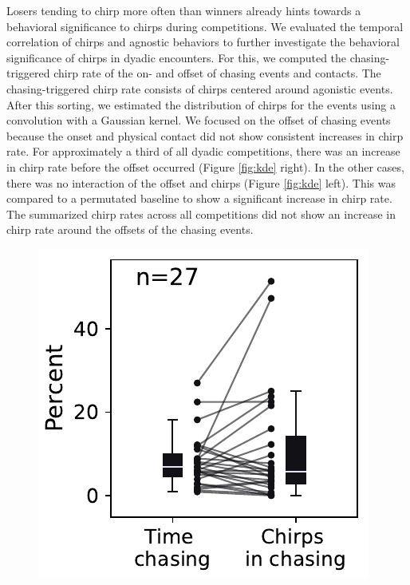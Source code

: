 Losers tending to chirp more often than winners already hints towards a behavioral significance to chirps during competitions. We evaluated the temporal correlation of chirps and agnostic behaviors to further investigate the behavioral significance of chirps in dyadic encounters. For this, we computed the chasing-triggered chirp rate of the on- and offset of chasing events and contacts. The chasing-triggered chirp rate consists of chirps centered around agonistic events. After this sorting, we estimated the distribution of chirps for the events using a convolution with a Gaussian kernel. We focused on the offset of chasing events because the onset and physical contact did not show consistent increases in chirp rate. For approximately a third of all dyadic competitions, there was an increase in chirp rate before the offset occurred (Figure \ref{fig:kde} right). In the other cases, there was no interaction of the offset and chirps (Figure \ref{fig:kde} left). This was compared to a permutated baseline to show a significant increase in chirp rate. The summarized chirp rates across all competitions did not show an increase in chirp rate around the offsets of the chasing events.

\newpage
\FloatBarrier
\begin{figure}
    \centering
    \includegraphics[width=\linewidth]{figures/chirps_in_chasing.pdf}
    \label{fig:chasing}
\end{figure}
\FloatBarrier

